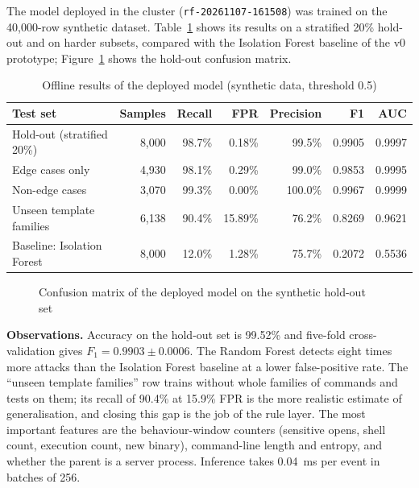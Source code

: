 The model deployed in the cluster (\texttt{rf-20261107-161508}) was trained on the
40,000-row synthetic dataset. Table~\ref{tab:offline} shows its results on a stratified
20\% hold-out and on harder subsets, compared with the Isolation Forest baseline of the
v0 prototype; Figure~\ref{fig:cm-holdout} shows the hold-out confusion matrix.

\begin{table}[H]
\centering
\caption{Offline results of the deployed model (synthetic data, threshold 0.5)}
\label{tab:offline}
\small
\begin{tabular}{lrrrrrr}
\toprule
\textbf{Test set} & \textbf{Samples} & \textbf{Recall} & \textbf{FPR} & \textbf{Precision} & \textbf{F1} & \textbf{AUC} \\
\midrule
Hold-out (stratified 20\%) & 8,000 & 98.7\% & 0.18\% & 99.5\% & 0.9905 & 0.9997 \\
Edge cases only            & 4,930 & 98.1\% & 0.29\% & 99.0\% & 0.9853 & 0.9995 \\
Non-edge cases             & 3,070 & 99.3\% & 0.00\% & 100.0\% & 0.9967 & 0.9999 \\
Unseen template families   & 6,138 & 90.4\% & 15.89\% & 76.2\% & 0.8269 & 0.9621 \\
\midrule
Baseline: Isolation Forest & 8,000 & 12.0\% & 1.28\% & 75.7\% & 0.2072 & 0.5536 \\
\bottomrule
\end{tabular}
\end{table}

\begin{figure}[H]
\centering
{}
\caption{Confusion matrix of the deployed model on the synthetic hold-out set}
\label{fig:cm-holdout}
\end{figure}

\textbf{Observations.} Accuracy on the hold-out set is 99.52\% and five-fold
cross-validation gives $F_1 = 0.9903 \pm 0.0006$. The Random Forest detects eight
times more attacks than the Isolation Forest baseline at a lower false-positive rate.
The ``unseen template families'' row trains without whole families of commands and
tests on them; its recall of 90.4\% at 15.9\% FPR is the more realistic estimate of
generalisation, and closing this gap is the job of the rule layer. The most important
features are the behaviour-window counters (sensitive opens, shell count, execution
count, new binary), command-line length and entropy, and whether the parent is a
server process. Inference takes 0.04~ms per event in batches of 256.

